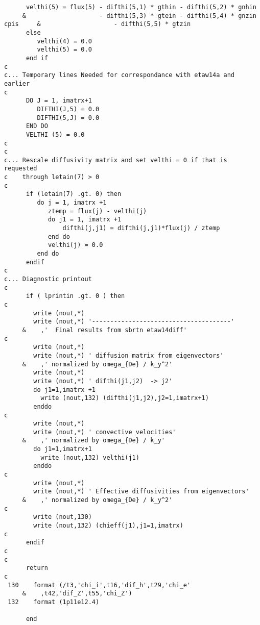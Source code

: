 \begin{verbatim}
      velthi(5) = flux(5) - difthi(5,1) * gthin - difthi(5,2) * gnhin
     &                    - difthi(5,3) * gtein - difthi(5,4) * gnzin
cpis     &                    - difthi(5,5) * gtzin
      else
         velthi(4) = 0.0
         velthi(5) = 0.0
      end if
c
c... Temporary lines Needed for correspondance with etaw14a and earlier
c
      DO J = 1, imatrx+1
         DIFTHI(J,5) = 0.0
         DIFTHI(5,J) = 0.0
      END DO
      VELTHI (5) = 0.0
c
c
c... Rescale diffusivity matrix and set velthi = 0 if that is requested
c    through letain(7) > 0
c      
      if (letain(7) .gt. 0) then
         do j = 1, imatrx +1
            ztemp = flux(j) - velthi(j)
            do j1 = 1, imatrx +1
                difthi(j,j1) = difthi(j,j1)*flux(j) / ztemp
            end do
            velthi(j) = 0.0
         end do
      endif
c
c... Diagnostic printout
c
      if ( lprintin .gt. 0 ) then
c
        write (nout,*)
        write (nout,*) '--------------------------------------'
     &    ,'  Final results from sbrtn etaw14diff'
c
        write (nout,*)
        write (nout,*) ' diffusion matrix from eigenvectors'
     &    ,' normalized by omega_{De} / k_y^2'
        write (nout,*)
        write (nout,*) ' difthi(j1,j2)  -> j2'
        do j1=1,imatrx +1
          write (nout,132) (difthi(j1,j2),j2=1,imatrx+1)
        enddo
c
        write (nout,*)
        write (nout,*) ' convective velocities'
     &    ,' normalized by omega_{De} / k_y'
        do j1=1,imatrx+1
          write (nout,132) velthi(j1)
        enddo
c
        write (nout,*)
        write (nout,*) ' Effective diffusivities from eigenvectors'
     &    ,' normalized by omega_{De} / k_y^2'
c
        write (nout,130)
        write (nout,132) (chieff(j1),j1=1,imatrx)
c
      endif
c
c
      return
c
 130    format (/t3,'chi_i',t16,'dif_h',t29,'chi_e'
     &    ,t42,'dif_Z',t55,'chi_Z')
 132    format (1p11e12.4)

      end
\end{verbatim}





